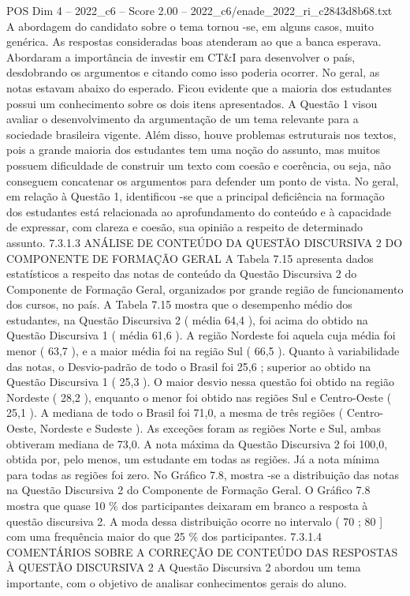 \begin{textsample}{POS Dim 4 – 2022\_c6 – Score 2.00 – 2022\_c6/enade\_2022\_ri\_c2843d8b68.txt}
A abordagem do candidato sobre o tema tornou -se, em alguns casos, muito genérica.
As respostas consideradas boas atenderam ao que a banca esperava.
Abordaram a importância de investir em CT\&I para desenvolver o país, desdobrando os argumentos e citando como isso poderia ocorrer.
No geral, as notas estavam abaixo do esperado.
Ficou evidente que a maioria dos estudantes possui um conhecimento sobre os dois itens apresentados.
A Questão 1 visou avaliar o desenvolvimento da argumentação de um tema relevante para a sociedade brasileira vigente.
Além disso, houve problemas estruturais nos textos, pois a grande maioria dos estudantes tem uma noção do assunto, mas muitos possuem dificuldade de construir um texto com coesão e coerência, ou seja, não conseguem concatenar os argumentos para defender um ponto de vista.
No geral, em relação à Questão 1, identificou -se que a principal deficiência na formação dos estudantes está relacionada ao aprofundamento do conteúdo e à capacidade de expressar, com clareza e coesão, sua opinião a respeito de determinado assunto. 7.3.1.3 ANÁLISE DE CONTEÚDO DA QUESTÃO DISCURSIVA 2 DO COMPONENTE DE FORMAÇÃO GERAL A Tabela 7.15 apresenta dados estatísticos a respeito das notas de conteúdo da Questão Discursiva 2 do Componente de Formação Geral, organizados por grande região de funcionamento dos cursos, no país.
A Tabela 7.15 mostra que o desempenho médio dos estudantes, na Questão Discursiva 2 ( média 64,4 ), foi acima do obtido na Questão Discursiva 1 ( média 61,6 ).
A região Nordeste foi aquela cuja média foi menor ( 63,7 ), e a maior média foi na região Sul ( 66,5 ).
Quanto à variabilidade das notas, o Desvio-padrão de todo o Brasil foi 25,6 ; superior ao obtido na Questão Discursiva 1 ( 25,3 ).
O maior desvio nessa questão foi obtido na região Nordeste ( 28,2 ), enquanto o menor foi obtido nas regiões Sul e Centro-Oeste ( 25,1 ).
A mediana de todo o Brasil foi 71,0, a mesma de três regiões ( Centro-Oeste, Nordeste e Sudeste ).
As exceções foram as regiões Norte e Sul, ambas obtiveram mediana de 73,0.
A nota máxima da Questão Discursiva 2 foi 100,0, obtida por, pelo menos, um estudante em todas as regiões.
Já a nota mínima para todas as regiões foi zero.
No Gráfico 7.8, mostra -se a distribuição das notas na Questão Discursiva 2 do Componente de Formação Geral.
O Gráfico 7.8 mostra que quase 10 \% dos participantes deixaram em branco a resposta à questão discursiva 2.
A moda dessa distribuição ocorre no intervalo ( 70 ; 80 ] com uma frequência maior do que 25 \% dos participantes. 7.3.1.4 COMENTÁRIOS SOBRE A CORREÇÃO DE CONTEÚDO DAS RESPOSTAS À QUESTÃO DISCURSIVA 2 A Questão Discursiva 2 abordou um tema importante, com o objetivo de analisar conhecimentos gerais do aluno.

\end{textsample}
